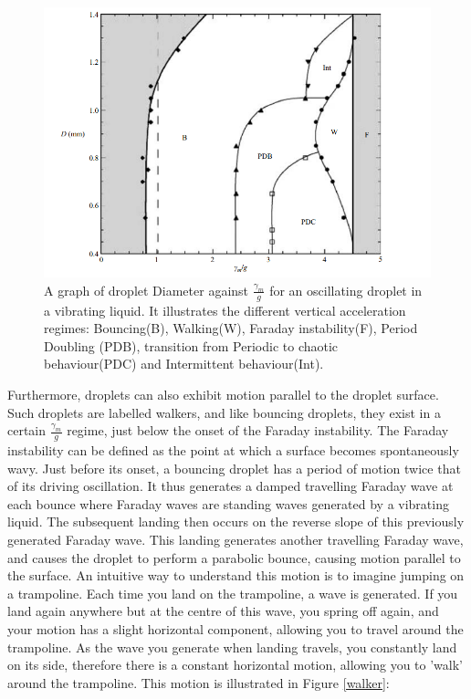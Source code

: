 \begin{figure}[ht]
\includegraphics[width=12cm]{theory/regime}
\centering
\caption{A graph of droplet Diameter against $\frac{\gamma_{m}}{g}$ for an oscillating droplet in a vibrating liquid. It illustrates the different vertical acceleration regimes: Bouncing(B), Walking(W), Faraday instability(F), Period Doubling (PDB), transition from Periodic to chaotic behaviour(PDC)  and Intermittent behaviour(Int).}
\centering
\label{regimes}
\end{figure}

Furthermore, droplets can also exhibit motion parallel to the droplet surface. Such droplets are labelled walkers, and like bouncing droplets, they exist in a certain $\frac{\gamma_{m}}{g}$ regime, just below the onset of the Faraday instability. The Faraday instability can be defined as the point at which a surface becomes spontaneously wavy. Just before its onset, a bouncing droplet has a period of motion twice that of its driving oscillation. It thus generates a damped travelling Faraday wave at each bounce where Faraday waves are standing waves generated by a vibrating liquid. The subsequent landing then occurs on the reverse slope of this previously generated Faraday wave. This landing generates another travelling Faraday wave, and causes the droplet to perform a parabolic bounce, causing motion parallel to the surface. An intuitive way to understand this motion is to imagine jumping on a trampoline. Each time you land on the trampoline, a wave is generated. If you land again anywhere but at the centre of this wave, you spring off again, and your motion has a slight horizontal component, allowing you to travel around the trampoline. As the wave you generate when landing travels, you constantly land on its side, therefore there is a constant horizontal motion, allowing you to 'walk' around the trampoline. This motion is illustrated in Figure \ref{walker}: 

